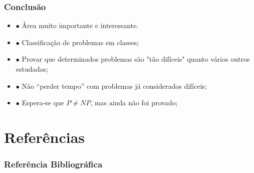 \documentclass{beamer}
\begin{document}
\begin{frame}
\frametitle{Conclusão}

\begin{itemize}
	\item $\bullet$ Área muito importante e interessante.
    \item $\bullet$ Classificação de problemas em classes;
    \item $\bullet$ Provar que determinados problemas são "tão difíceis" quanto vários outros estudados;
    \item $\bullet$ Não ``perder tempo'' com problemas já considerados difíceis;
    \item $\bullet$ Espera-se que $P \neq NP$, mas ainda não foi provado;
\end{itemize}

\end{frame}

\section{Referências}

\nocite{*}

\begin{frame}[allowframebreaks]
\frametitle{Referência Bibliográfica}


\end{frame}
\end{document}
